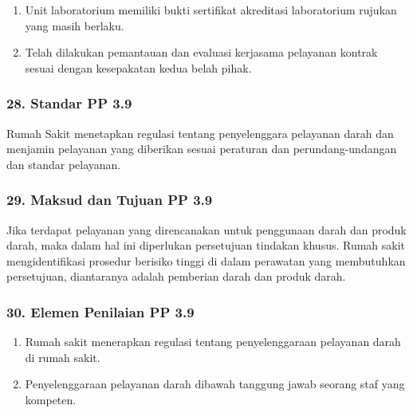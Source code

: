\documentclass[
]{book}
\providecommand{\tightlist}{%
  \setlength{\itemsep}{0pt}\setlength{\parskip}{0pt}}
\begin{document}
\begin{enumerate}
\def\labelenumi{\alph{enumi}.}
\tightlist
\item
  Unit laboratorium memiliki bukti sertifikat akreditasi laboratorium rujukan yang masih berlaku.
\item
  Telah dilakukan pemantauan dan evaluasi kerjasama pelayanan kontrak sesuai dengan kesepakatan kedua belah pihak.
\end{enumerate}

\hypertarget{standar-pp-3.9}{%
\subsubsection*{28. Standar PP 3.9}\label{standar-pp-3.9}}

Rumah Sakit menetapkan regulasi tentang penyelenggara pelayanan darah dan menjamin pelayanan yang diberikan sesuai peraturan dan perundang-undangan dan standar pelayanan.

\hypertarget{maksud-dan-tujuan-pp-3.9}{%
\subsubsection*{29. Maksud dan Tujuan PP 3.9}\label{maksud-dan-tujuan-pp-3.9}}

Jika terdapat pelayanan yang direncanakan untuk penggunaan darah dan produk darah, maka dalam hal ini diperlukan persetujuan tindakan khusus. Rumah sakit mengidentifikasi prosedur berisiko tinggi di dalam perawatan yang membutuhkan persetujuan, diantaranya adalah pemberian darah dan produk darah.

\hypertarget{elemen-penilaian-pp-3.9}{%
\subsubsection*{30. Elemen Penilaian PP 3.9}\label{elemen-penilaian-pp-3.9}}

\begin{enumerate}
\def\labelenumi{\alph{enumi}.}
\tightlist
\item
  Rumah sakit menerapkan regulasi tentang penyelenggaraan pelayanan darah di rumah sakit.
\item
  Penyelenggaraan pelayanan darah dibawah tanggung jawab seorang staf yang kompeten.
\end{enumerate}
\end{document}
